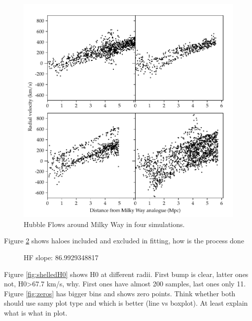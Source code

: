 \documentclass[english, oneside]{HYgradu}
\begin{document}
\begin{figure}
    \centering
    \includegraphics{kuvat/hubblediagrams.pdf}
    \caption{Hubble Flows around Milky Way in four simulations.}\label{fig:hubblediagrams}
\end{figure}

Figure \ref{fig:hubblefit} shows haloes included and excluded in fitting, how is the process done

\begin{figure}
    \centering
    
    \caption{HF slope: 86.9929348817}\label{fig:hubblefit}
\end{figure}

Figure \ref{fig:shelledH0} shows H0 at different radii. First bump is clear, latter ones not, H0>67.7 km/s, why. First ones have almost 200 samples, last ones only 11. Figure \ref{fig:zeros} has bigger bins and shows zero points. Think whether both should use samy plot type and which is better (line vs boxplot). At least explain what is what in plot.

\end{document}
